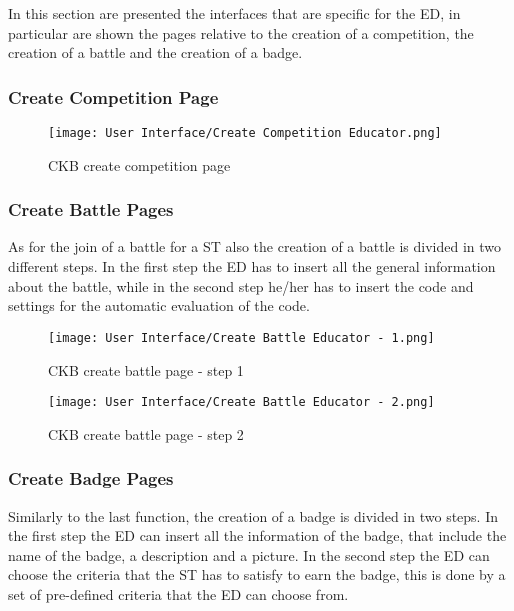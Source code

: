In this section are presented the interfaces that are specific for the ED, in particular are shown the pages relative to the creation of a competition, the creation of a battle and the creation of a badge.

\subsubsection*{Create Competition Page}
\label{ss:create_competition_page}%

\begin{figure}[H]
  \centering
  \texttt{[image: User Interface/Create Competition Educator.png]}
  \caption{CKB create competition page}
  \label{fig:create_competition}
\end{figure}


\subsubsection*{Create Battle Pages}
\label{ss:create_battle_pages}%
As for the join of a battle for a ST also the creation of a battle is divided in two different steps. In the first step the ED has to insert all the general information about the battle, while in the second step he/her has to insert the code and settings for the automatic evaluation of the code.

\begin{figure}[H]
  \centering
  \texttt{[image: User Interface/Create Battle Educator - 1.png]}
  \caption{CKB create battle page - step 1}
  \label{fig:create_battle1}
\end{figure}

\begin{figure}[H]
  \centering
  \texttt{[image: User Interface/Create Battle Educator - 2.png]}
  \caption{CKB create battle page - step 2}
  \label{fig:create_battle2}
\end{figure}


\subsubsection*{Create Badge Pages}
\label{ss:create_badge_pages}%
Similarly to the last function, the creation of a badge is divided in two steps. In the first step the ED can insert all the information of the badge, that include the name of the badge, a description and a picture. In the second step the ED can choose the criteria that the ST has to satisfy to earn the badge, this is done by a set of pre-defined criteria that the ED can choose from.

